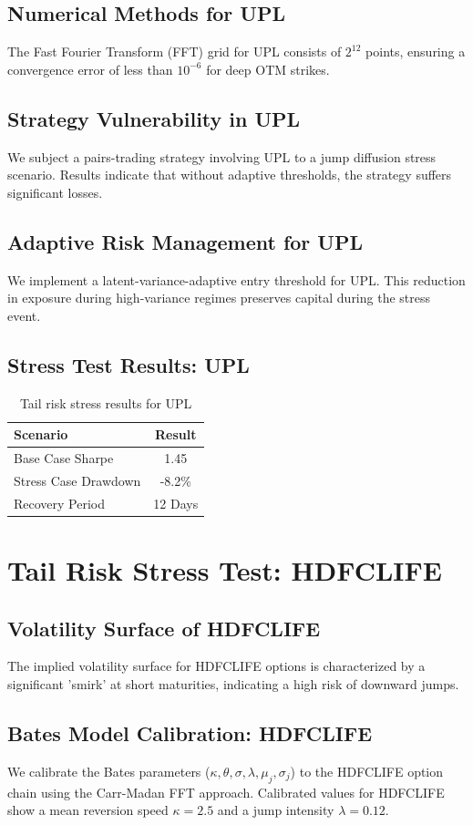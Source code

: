 \documentclass[12pt,a4paper,twoside]{article}
\begin{document}
\subsection{Numerical Methods for UPL}
The Fast Fourier Transform (FFT) grid for UPL consists of $2^{12}$ points, ensuring a convergence error of less than $10^{-6}$ for deep OTM strikes.
\subsection{Strategy Vulnerability in UPL}
We subject a pairs-trading strategy involving UPL to a jump diffusion stress scenario. Results indicate that without adaptive thresholds, the strategy suffers significant losses.
\subsection{Adaptive Risk Management for UPL}
We implement a latent-variance-adaptive entry threshold for UPL. This reduction in exposure during high-variance regimes preserves capital during the stress event.
\subsection{Stress Test Results: UPL}
\begin{table}[H]
\centering
\begin{tabular}{|l|c|}
\hline
Scenario & Result \\
\hline
Base Case Sharpe & 1.45 \\
Stress Case Drawdown & -8.2\% \\
Recovery Period & 12 Days \\
\hline
\end{tabular}
\caption{Tail risk stress results for UPL}
\end{table}
\newpage

\section{Tail Risk Stress Test: HDFCLIFE}
\subsection{Volatility Surface of HDFCLIFE}
The implied volatility surface for HDFCLIFE options is characterized by a significant 'smirk' at short maturities, indicating a high risk of downward jumps.
\subsection{Bates Model Calibration: HDFCLIFE}
We calibrate the Bates parameters ($\kappa, \theta, \sigma, \lambda, \mu_j, \sigma_j$) to the HDFCLIFE option chain using the Carr-Madan FFT approach.
Calibrated values for HDFCLIFE show a mean reversion speed $\kappa = 2.5$ and a jump intensity $\lambda = 0.12$.
\end{document}
